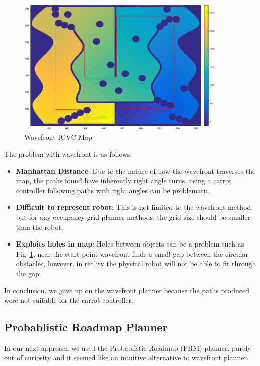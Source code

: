 \documentclass{article}
\begin{document}
\begin{figure}[H]
	\centering
	\includegraphics[width=0.9\textwidth]{images/wavefront_igvc.eps}
	\caption{Wavefront IGVC Map}
	\label{fig:wavefront}
\end{figure}

The problem with wavefront is as follows:

\begin{itemize}
	\item{\textbf{Manhattan Distance}: Due to the nature of how the wavefront traverses the map, the paths found have inherently right angle turns, using a carrot controller following paths with right angles can be problematic.}
	
	\item{\textbf{Difficult to represent robot}: This is not limited to the wavefront method, but for any occupancy grid planner methods, the grid size should be smaller than the robot.}
	
	\item{\textbf{Exploits holes in map}: Holes between objects can be a problem such as Fig~\ref{fig:wavefront}, near the start point wavefront finds a small gap between the circular obstacles, however, in reality the physical robot will not be able to fit through the gap.}
\end{itemize}

In conclusion, we gave up on the wavefront planner because the paths produced were not suitable for the carrot controller.



\newpage
\subsection{Probablistic Roadmap Planner}
\label{subsec:prm}
In our next approach we used the Probablistic Roadmap (PRM) planner, purely out of curiosity and it seemed like an intuitive alternative to wavefront planner. 
\end{document}
